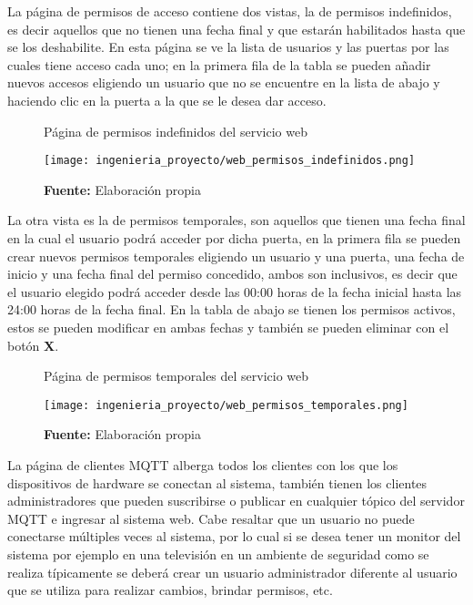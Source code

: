 \documentclass[../principal]{subfiles}
\begin{document}
  La página de permisos de acceso contiene dos vistas, la de permisos indefinidos, es decir aquellos que no tienen una fecha final y que estarán habilitados hasta que se los deshabilite. En esta página se ve la lista de usuarios y las puertas por las cuales tiene acceso cada uno; en la primera fila de la tabla se pueden añadir nuevos accesos eligiendo un usuario que no se encuentre en la lista de abajo y haciendo clic en la puerta a la que se le desea dar acceso.

  \begin{figure}[H]
    \centering
    \caption{Página de permisos indefinidos del servicio web}
    \texttt{[image: ingenieria\_proyecto/web\_permisos\_indefinidos.png]}
    \caption*{\textbf{Fuente:} Elaboración propia}
    \label{fig:web_permisos_indefinidos}
  \end{figure}

  La otra vista es la de permisos temporales, son aquellos que tienen una fecha final en la cual el usuario podrá acceder por dicha puerta, en la primera fila se pueden crear nuevos permisos temporales eligiendo un usuario y una puerta, una fecha de inicio y una fecha final del permiso concedido, ambos son inclusivos, es decir que el usuario elegido podrá acceder desde las 00:00 horas de la fecha inicial hasta las 24:00 horas de la fecha final. En la tabla de abajo se tienen los permisos activos, estos se pueden modificar en ambas fechas y también se pueden eliminar con el botón \textbf{X}.

  \begin{figure}[H]
    \centering
    \caption{Página de permisos temporales del servicio web}
    \texttt{[image: ingenieria\_proyecto/web\_permisos\_temporales.png]}
    \caption*{\textbf{Fuente:} Elaboración propia}
    \label{fig:web_permisos_temporales}
  \end{figure}

  La página de clientes MQTT alberga todos los clientes con los que los dispositivos de hardware se conectan al sistema, también tienen los clientes administradores que pueden suscribirse o publicar en cualquier tópico del servidor MQTT e ingresar al sistema web. Cabe resaltar que un usuario no puede conectarse múltiples veces al sistema, por lo cual si se desea tener un monitor del sistema por ejemplo en una televisión en un ambiente de seguridad como se realiza típicamente se deberá crear un usuario administrador diferente al usuario que se utiliza para realizar cambios, brindar permisos, etc.
\end{document}
